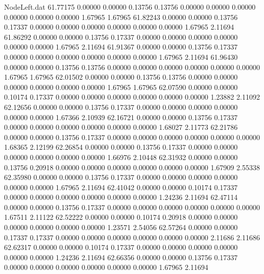 \begin{filecontents}{NodeLeft.dat}
  61.77175    0.00000    0.00000     0.13756    0.13756    0.00000    0.00000    0.00000    0.00000    0.00000    0.00000    1.67965    1.67965
  61.82243    0.00000    0.00000     0.13756    0.17337    0.00000    0.00000    0.00000    0.00000    0.00000    0.00000    1.67965    2.11694
  61.86292    0.00000    0.00000     0.13756    0.17337    0.00000    0.00000    0.00000    0.00000    0.00000    0.00000    1.67965    2.11694
  61.91367    0.00000    0.00000     0.13756    0.17337    0.00000    0.00000    0.00000    0.00000    0.00000    0.00000    1.67965    2.11694
  61.96430    0.00000    0.00000     0.13756    0.13756    0.00000    0.00000    0.00000    0.00000    0.00000    0.00000    1.67965    1.67965
  62.01502    0.00000    0.00000     0.13756    0.13756    0.00000    0.00000    0.00000    0.00000    0.00000    0.00000    1.67965    1.67965
  62.07590    0.00000    0.00000     0.10174    0.17337    0.00000    0.00000    0.00000    0.00000    0.00000    0.00000    1.23882    2.11092
  62.12656    0.00000    0.00000     0.13756    0.17337    0.00000    0.00000    0.00000    0.00000    0.00000    0.00000    1.67366    2.10939
  62.16721    0.00000    0.00000     0.13756    0.17337    0.00000    0.00000    0.00000    0.00000    0.00000    0.00000    1.68027    2.11773
  62.21786    0.00000    0.00000     0.13756    0.17337    0.00000    0.00000    0.00000    0.00000    0.00000    0.00000    1.68365    2.12199
  62.26854    0.00000    0.00000     0.13756    0.17337    0.00000    0.00000    0.00000    0.00000    0.00000    0.00000    1.66976    2.10448
  62.31932    0.00000    0.00000     0.13756    0.20918    0.00000    0.00000    0.00000    0.00000    0.00000    0.00000    1.67909    2.55338
  62.35980    0.00000    0.00000     0.13756    0.17337    0.00000    0.00000    0.00000    0.00000    0.00000    0.00000    1.67965    2.11694
  62.41042    0.00000    0.00000     0.10174    0.17337    0.00000    0.00000    0.00000    0.00000    0.00000    0.00000    1.24236    2.11694
  62.47114    0.00000    0.00000     0.13756    0.17337    0.00000    0.00000    0.00000    0.00000    0.00000    0.00000    1.67511    2.11122
  62.52222    0.00000    0.00000     0.10174    0.20918    0.00000    0.00000    0.00000    0.00000    0.00000    0.00000    1.23571    2.54056
  62.57264    0.00000    0.00000     0.17337    0.17337    0.00000    0.00000    0.00000    0.00000    0.00000    0.00000    2.11686    2.11686
  62.62317    0.00000    0.00000     0.10174    0.17337    0.00000    0.00000    0.00000    0.00000    0.00000    0.00000    1.24236    2.11694
  62.66356    0.00000    0.00000     0.13756    0.17337    0.00000    0.00000    0.00000    0.00000    0.00000    0.00000    1.67965    2.11694

\end{filecontents}

